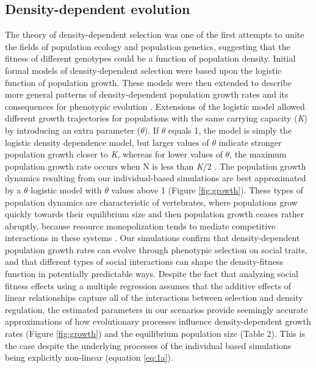 \documentclass{article}
\begin{document}
\subsection{Density-dependent evolution}
The theory of density-dependent selection was one of the first attempts to unite the fields of population ecology and population genetics, suggesting that the fitness of different genotypes could be a function of population density. Initial formal models of density-dependent selection \citep{Anderson1971, Charlesworth1971} were based upon the logistic function of population growth. These models were then extended to describe more general patterns of density-dependent population growth rates \citep{Gilpin1973a} and its consequences for phenotypic evolution \citep{Gilpin1976}. Extensions of the logistic model allowed different growth trajectories for populations with the same carrying capacity (\textit{K}) by introducing an extra parameter ($\theta$). If $\theta$ equals 1, the model is simply the logistic density dependence model, but larger values of $\theta$ indicate stronger population growth closer to \textit{K}, whereas for lower values of $\theta$, the maximum population growth rate occurs when N is less than \textit{K}/2 \citep{Lande2003}. The population growth dynamics resulting from our individual-based simulations are best approximated by a $\theta$ logistic model with $\theta$ values above 1 (Figure \ref{fig:growth}). These types of population dynamics are characteristic of vertebrates, where populations grow quickly towards their equilibrium size and then population growth ceases rather abruptly, because resource monopolization tends to mediate competitive interactions in these systems \citep{Gilpin1973a}. Our simulations  confirm that density-dependent population growth rates can evolve through phenotypic selection on social traits, and that different types of social interactions can shape the density-fitness function in potentially predictable ways. Despite the fact that analyzing social fitness effects using a multiple regression assumes that the additive effects of linear relationships capture all of the interactions between selection and density regulation, the estimated parameters in our scenarios provide seemingly accurate approximations of how evolutionary processes influence density-dependent growth rates (Figure \ref{fig:growth}) and the equilibrium population size (Table 2). This is the case despite the underlying processes of the individual based simulations being explicitly non-linear (equation \ref{eq:1a}). 
\end{document}
